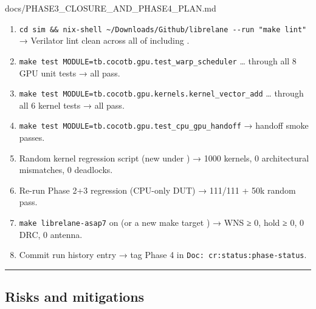 \begin{relocated}{docs/PHASE3_CLOSURE_AND_PHASE4_PLAN.md}
\begin{enumerate}
\def\labelenumi{\arabic{enumi}.}
\tightlist
\item
  \texttt{cd\ sim\ \&\&\ nix-\allowbreak{}shell\ \textasciitilde{}/\allowbreak{}Downloads/\allowbreak{}Github/\allowbreak{}librelane\ -\allowbreak{}-\allowbreak{}run\ "make\ lint"}
  → Verilator lint clean across all of  including
  .
\item
  \texttt{make\ test\ MODULE=\allowbreak{}tb.\allowbreak{}cocotb.\allowbreak{}gpu.\allowbreak{}test\_\allowbreak{}warp\_\allowbreak{}scheduler}
  \ldots{} through all 8 GPU unit tests → all pass.
\item
  \texttt{make\ test\ MODULE=\allowbreak{}tb.\allowbreak{}cocotb.\allowbreak{}gpu.\allowbreak{}kernels.\allowbreak{}kernel\_\allowbreak{}vector\_\allowbreak{}add}
  \ldots{} through all 6 kernel tests → all pass.
\item
  \texttt{make\ test\ MODULE=\allowbreak{}tb.\allowbreak{}cocotb.\allowbreak{}gpu.\allowbreak{}test\_\allowbreak{}cpu\_\allowbreak{}gpu\_\allowbreak{}handoff}
  → handoff smoke passes.
\item
  Random kernel regression script (new under ) →
  1000 kernels, 0 architectural mismatches, 0 deadlocks.
\item
  Re-run Phase 2+3 regression (CPU-only DUT) → 111/111 + 50k random
  pass.
\item
  \texttt{make\ librelane-\allowbreak{}asap7} on
   (or a new make target
  ) → WNS ≥ 0, hold ≥ 0, 0 DRC, 0 antenna.
\item
  Commit run history entry → tag Phase 4 \ok{} in
  \texttt{Doc:\allowbreak{}\ cr:\allowbreak{}status:\allowbreak{}phase-\allowbreak{}status}.
\end{enumerate}

\begin{center}\rule{0.5\linewidth}{0.5pt}\end{center}

\subsection{Risks and mitigations}\label{ds:ch:phase3-closure-phase4-plan:10-risks-and-mitigations}

{\footnotesize\setlength{\tabcolsep}{3pt}

}
\end{relocated}

